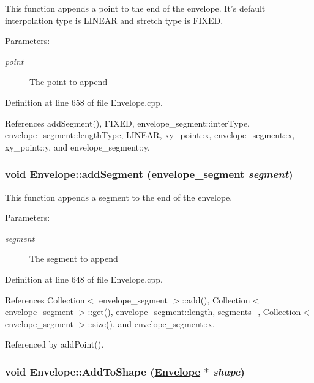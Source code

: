 This function appends a point to the end of the envelope. It's default interpolation type is LINEAR and stretch type is FIXED. \begin{Desc}
\item[Parameters:]
\begin{description}
\item[{\em point}]The point to append \end{description}
\end{Desc}


Definition at line 658 of file Envelope.cpp.

References add\-Segment(), FIXED, envelope\_\-segment::inter\-Type, envelope\_\-segment::length\-Type, LINEAR, xy\_\-point::x, envelope\_\-segment::x, xy\_\-point::y, and envelope\_\-segment::y.\hypertarget{classEnvelope_a19}{
\subsubsection[addSegment]{\setlength{\rightskip}{0pt plus 5cm}void Envelope::add\-Segment (\hyperlink{structenvelope__segment}{envelope\_\-segment} {\em segment})}}
\label{classEnvelope_a19}


This function appends a segment to the end of the envelope. \begin{Desc}
\item[Parameters:]
\begin{description}
\item[{\em segment}]The segment to append \end{description}
\end{Desc}


Definition at line 648 of file Envelope.cpp.

References Collection$<$ envelope\_\-segment $>$::add(), Collection$<$ envelope\_\-segment $>$::get(), envelope\_\-segment::length, segments\_\-, Collection$<$ envelope\_\-segment $>$::size(), and envelope\_\-segment::x.

Referenced by add\-Point().\hypertarget{classEnvelope_a10}{
\subsubsection[AddToShape]{\setlength{\rightskip}{0pt plus 5cm}void Envelope::Add\-To\-Shape (\hyperlink{classEnvelope}{Envelope} $\ast$ {\em shape})}}
\label{classEnvelope_a10}


